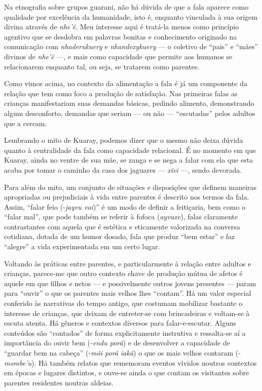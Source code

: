 Na etnografia sobre grupos guarani, não há dúvida de que a fala aparece
como qualidade por excelência da humanidade, isto é, enquanto vinculada
à sua origem divina através de \emph{nhe’ë}. Meu interesse aqui é tratá-la
menos como princípio agentivo que se desdobra em palavras bonitas e
conhecimento originado na comunicação com \emph{nhaderukuery} e \emph{nhandexykuery}
--- o coletivo de ``pais'' e ``mães'' divinos de \emph{nhe’ë} ---, e mais como
capacidade que permite aos humanos se relacionarem enquanto tal, ou
seja, se tratarem como parentes.

Como vimos acima, no contexto da alimentação a fala é já um componente
da relação que tem como foco a produção de satisfação. Nas primeiras
falas as crianças manifestariam suas demandas básicas, pedindo
alimento, demonstrando algum desconforto, demandas que seriam --- ou não
--- ``escutadas'' pelos adultos que a cercam. 

Lembrando o mito de Kuaray, podemos dizer que o mesmo não deixa dúvida
quanto à centralidade da fala como capacidade relacional. É no momento
em que Kuaray, ainda no ventre de sua mãe, se zanga e se nega a falar
com ela que esta acaba por tomar o caminho da casa dos jaguares --- \emph{xivi}
---, sendo devorada.

Para além do mito, um conjunto de situações e disposições que definem
maneiras apropriadas ou prejudiciais à vida entre parentes é descrito
nos termos da fala. Assim, ``falar feio (-\emph{jayvu vai})'' é um modo de
definir a feitiçaria, bem como o ``falar mal'', que pode também se
referir à fofoca (\emph{ayvuxe}), falas claramente contrastantes com aquela
que é estética e eticamente valorizada na conversa cotidiana, dotada de
um humor dosado, fala que produz ``bem estar'' e faz ``alegre'' a vida
experimentada em um certo lugar.

Voltando às práticas entre parentes, e particularmente à relação entre
adultos e crianças, parece-me que outro contexto chave de produção
mútua de afetos é aquele em que filhos e netos --- e possivelmente outros
jovens presentes --- param para ``ouvir'' o que os parentes mais velhos lhes
``contam''. Há um valor especial conferido às narrativas do tempo antigo,
que costumam mobilizar bastante o interesse de crianças, que deixam de
entreter-se com brincadeiras e voltam-se à escuta atenta. Há gêneros e
contextos diversos para falar-e-escutar. Alguns conteúdos são ``contados''
de forma explicitamente instrutiva e ressalta-se aí a importância do
ouvir bem (-\emph{endu porã}) e de desenvolver a capacidade de ``guardar bem na
cabeça'' (-\emph{mõi porã iakã}) o que os mais velhos contaram (-\emph{mombe’u}). Há
também relatos que rememoram eventos vividos noutros contextos em
épocas e lugares distintos, e ouve-se ainda o que contam os visitantes
sobre parentes residentes noutras aldeias.


